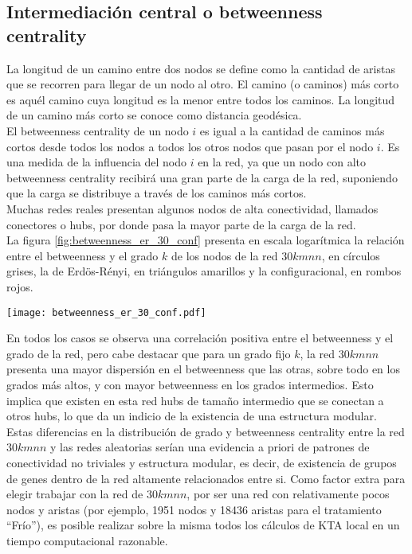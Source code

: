 \subsection*{Intermediación central o betweenness centrality}
La longitud de un camino entre dos nodos se define como la cantidad de aristas que se recorren para llegar de un nodo al otro. El camino (o caminos) más corto es aquél camino cuya longitud es la menor entre todos los caminos. La longitud de un camino más corto se conoce como distancia geodésica.\\
El betweenness centrality de un nodo $i$ es igual a la cantidad de caminos más cortos desde todos los nodos a todos los otros nodos que pasan por el nodo $i$. Es una medida de la influencia del nodo $i$ en la red, ya que un nodo con alto betweenness centrality recibirá una gran parte de la carga de la red, suponiendo que la carga se distribuye a través de los caminos más cortos.\\
Muchas redes reales presentan algunos nodos de alta conectividad, llamados conectores o hubs, por donde pasa la mayor parte de la carga de la red.\\
La figura \ref{fig:betweenness_er_30_conf} presenta en escala logarítmica la relación entre el betweenness y el grado $k$ de los nodos de la red $30kmnn$, en círculos grises, la de Erdös-Rényi, en triángulos amarillos y la configuracional, en rombos rojos.\\
\begin{center}
\texttt{[image: betweenness\_er\_30\_conf.pdf]}
\label{fig:betweenness_er_30_conf}
\end{center}
En todos los casos se observa una correlación positiva entre el betweenness y el grado de la red, pero cabe destacar que para un grado fijo $k$, la red $30kmnn$ presenta una mayor dispersión en el betweenness que las otras, sobre todo en los grados más altos, y con mayor betweenness en los grados intermedios. Esto implica que existen en esta red hubs de tamaño intermedio que se conectan a otros hubs, lo que da un indicio de la existencia de una estructura modular.\\
Estas diferencias en la distribución de grado y betweenness centrality entre la red $30kmnn$ y las redes aleatorias serían una evidencia a priori de patrones de conectividad no triviales y estructura modular, es decir, de existencia de grupos de genes dentro de la red altamente relacionados entre si. Como factor extra para elegir trabajar con la red de $30kmnn$, por ser una red con relativamente pocos nodos y aristas (por ejemplo, 1951 nodos y 18436 aristas para el tratamiento ``Frío''), es posible realizar sobre la misma todos los cálculos de KTA local en un tiempo computacional razonable.
